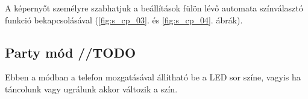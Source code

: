 \documentclass[../main.tex]{subfiles}
\begin{document}
            A képernyőt személyre szabhatjuk a beállítások fülön lévő automata színválasztó funkció bekapcsolásával (\ref{fig:s_cp_03}. és \ref{fig:s_cp_04}. ábrák).
            
            \begin{figure}[h!]
                \begin{floatrow}
                \end{floatrow}
            \end{figure}
        
        \subsection{Party mód //TODO}
            Ebben a módban a telefon mozgatásával állítható be a LED sor színe, vagyis ha táncolunk vagy ugrálunk akkor változik a szín. 
            
\end{document}

